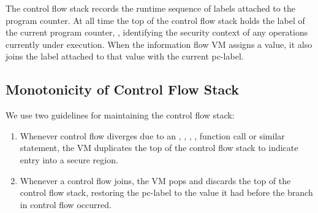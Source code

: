The control flow stack records the runtime sequence of labels attached to the program counter.
At all time the top of the control flow stack holds the label of the current program counter, , identifying the security context of any operations currently under execution.
When the information flow VM assigns a value, it also joins the label attached to that value with the current pc-label.

\subsection{Monotonicity of Control Flow Stack}

We use two guidelines for maintaining the control flow stack:
\begin{enumerate}
 \item Whenever control flow diverges due to an , , , , function call or similar statement, the VM duplicates the top of the control flow stack to indicate entry into a secure region.
 \item Whenever a control flow joins, the VM pops and discards the top of the control flow stack, restoring the pc-label to the value it had before the branch in control flow occurred.
\end{enumerate}

